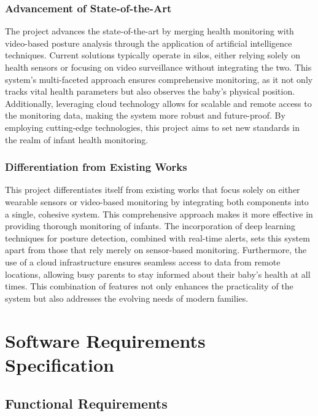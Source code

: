 \documentclass[12pt,a4paper]{report}
\begin{document}
  \subsection{Advancement of State-of-the-Art}
  The project advances the state-of-the-art by merging health monitoring with video-based posture analysis through the application of artificial intelligence techniques. Current solutions typically operate in silos, either relying solely on health sensors or focusing on video surveillance without integrating the two. This system’s multi-faceted approach ensures comprehensive monitoring, as it not only tracks vital health parameters but also observes the baby’s physical position. Additionally, leveraging cloud technology allows for scalable and remote access to the monitoring data, making the system more robust and future-proof. By employing cutting-edge technologies, this project aims to set new standards in the realm of infant health monitoring.
  
  \subsection{Differentiation from Existing Works}
  This project differentiates itself from existing works that focus solely on either wearable sensors or video-based monitoring by integrating both components into a single, cohesive system. This comprehensive approach makes it more effective in providing thorough monitoring of infants. The incorporation of deep learning techniques for posture detection, combined with real-time alerts, sets this system apart from those that rely merely on sensor-based monitoring. Furthermore, the use of a cloud infrastructure ensures seamless access to data from remote locations, allowing busy parents to stay informed about their baby’s health at all times. This combination of features not only enhances the practicality of the system but also addresses the evolving needs of modern families.
  


\chapter{Software Requirements Specification}

\section{Functional Requirements}
\end{document}
